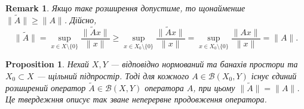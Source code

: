 \documentclass[a4paper, 10pt]{article}
\theoremstyle{theoremdd}
\theoremstyle{theoremdd}
\theoremstyle{theoremdd}
\theoremstyle{theoremdd}
\theoremstyle{theoremdd}
\newtheorem{proposition}[theorem]{Proposition}
\theoremstyle{theoremdd}
\newtheorem{remark}[theorem]{Remark}
\theoremstyle{theoremdd}
\theoremstyle{theoremdd}
\begin{document}
\begin{remark}
Якщо таке розширення допустиме, то щонайменше $\|\tilde{A}\| \geq \|A\|$. Дійсно,
\[
\|\tilde{A}\| = \displaystyle\sup_{x \in X \setminus \{0\}} \dfrac{\|\tilde{A}x\|}{\|x\|} \geq \sup_{x \in X_0 \setminus \{0\}} \dfrac{\|\tilde{A}x\|}{\|x\|} = \sup_{x \in X_0 \setminus \{0\}} \dfrac{\|Ax\|}{\|x\|} = \|A\|.
\]
\end{remark}

\begin{proposition}
Нехай $X,Y$ --- відповідно нормований та банахів простори та $X_0 \subset X$ --- щільний підпростір. Тоді для кожного $A \in \mathcal{B}(X_0,Y)$ існує єдиний розширений оператор $\tilde{A} \in \mathcal{B}(X,Y)$ оператора $A$, при цьому $\|\tilde{A}\| = \|A\|$.\\
\textit{Це твердежння описує так зване неперервне продовження оператора.}
\end{proposition}
\end{document}
